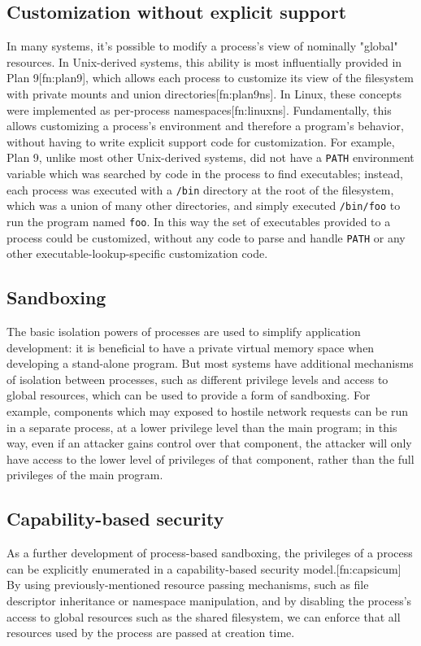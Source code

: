\documentclass{acmart}
\begin{document}
\subsection{Customization without explicit support}
In many systems,
it's possible to modify a process's view of nominally "global" resources.
In Unix-derived systems, this ability is most influentially provided in Plan 9[fn:plan9],
which allows each process to customize its view of the filesystem with private mounts and union directories[fn:plan9ns].
In Linux, these concepts were implemented as per-process namespaces[fn:linuxns].
Fundamentally,
this allows customizing a process's environment and therefore a program's behavior,
without having to write explicit support code for customization.
For example, Plan 9, unlike most other Unix-derived systems,
did not have a \texttt{PATH} environment variable which was searched by code in the process to find executables;
instead, each process was executed with a \texttt{/bin} directory at the root of the filesystem,
which was a union of many other directories,
and simply executed \texttt{/bin/foo} to run the program named \texttt{foo}.
In this way the set of executables provided to a process could be customized,
without any code to parse and handle \texttt{PATH} or any other executable-lookup-specific customization code.
\subsection{Sandboxing}
The basic isolation powers of processes are used to simplify application development:
it is beneficial to have a private virtual memory space when developing a stand-alone program.
But most systems have additional mechanisms of isolation between processes,
such as different privilege levels and access to global resources,
which can be used to provide a form of sandboxing.
For example, components which may exposed to hostile network requests
can be run in a separate process, at a lower privilege level than the main program;
in this way, even if an attacker gains control over that component,
the attacker will only have access to the lower level of privileges of that component,
rather than the full privileges of the main program.
\subsection{Capability-based security}
As a further development of process-based sandboxing,
the privileges of a process can be explicitly enumerated
in a capability-based security model.[fn:capsicum]
By using previously-mentioned resource passing mechanisms,
such as file descriptor inheritance or namespace manipulation,
and by disabling the process's access to global resources such as the shared filesystem,
we can enforce that all resources used by the process are passed at creation time.
\end{document}
